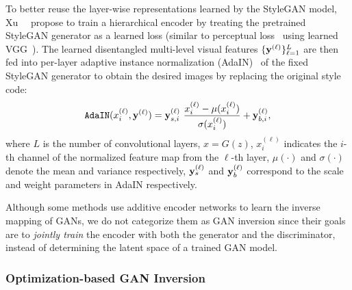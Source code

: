 To better reuse the layer-wise representations learned by the StyleGAN model, Xu~\etal~\cite{xu2020ghfeat} propose to train a hierarchical encoder by treating the pretrained StyleGAN generator as a learned loss (similar to perceptual loss~\cite{johnson2016perceptual} using learned VGG~\cite{simonyan2014very}). 
The learned disentangled multi-level visual features $\{\mathbf{y}^{(\ell)}\}^L_{\ell=1}$  are then fed into per-layer adaptive instance normalization (AdaIN)~\cite{huang2017adain} of the fixed StyleGAN generator to obtain the desired images by replacing the original style code:
\begin{equation}
\mathtt{AdaIN}({x}_i^{(\ell)}, \y^{(\ell)}) = \y_{s,i}^{(\ell)}\ \frac{{x}_i^{(\ell)} - \mu({x}_i^{(\ell)})}{\sigma({x}_i^{(\ell)})} + \y_{b,i}^{(\ell)},
\label{eq:adain}  
\end{equation}
where $L$ is the number of convolutional layers, ${x}=G(z)$, ${x}_i^{(\ell)}$ indicates the $i$-th channel of the normalized feature map from the $\ell$-th layer, $\mu(\cdot)$ and $\sigma(\cdot)$ denote the mean and variance respectively, $\mathbf{y}_s^{(\ell)}$ and $\mathbf{y}_b^{(\ell)}$ correspond to the scale and weight parameters in AdaIN respectively.

Although some methods\cite{donahue2016adversarial,dumoulin2016adversarially} use additive encoder networks to learn the inverse mapping of GANs, we do not categorize them as GAN inversion since their goals are to \emph{jointly train} the encoder with both the generator and the discriminator, instead of determining the latent space of a trained GAN model.

\subsubsection{Optimization-based GAN Inversion}
\label{sec:optimization-based}


